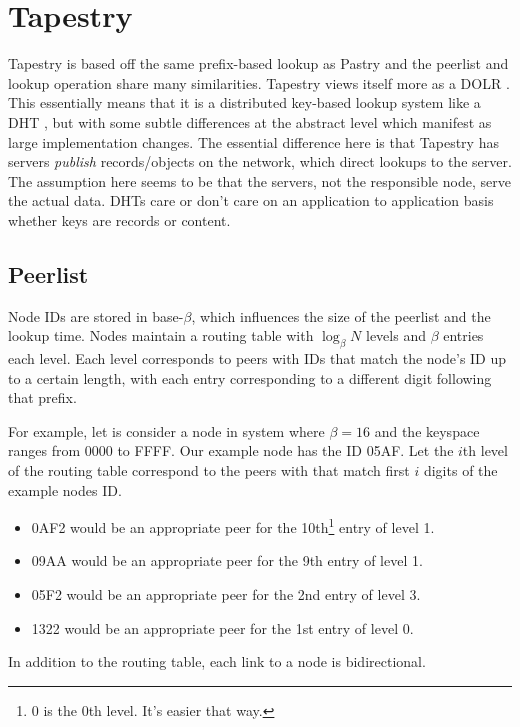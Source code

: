 \documentclass[10pt,letterpaper,twoside]{report}
\begin{document}
\section{Tapestry}
Tapestry \cite{tapestry} is based off the same prefix-based lookup \cite{prr} as Pastry \cite{pastry} and the peerlist and lookup operation share many similarities.
Tapestry views itself more as a DOLR \cite{dolr}.
This essentially means that it is a distributed key-based lookup system like a DHT \cite{hildrum2004distributed}, but with some subtle differences at the abstract level which manifest as large implementation changes.
The essential difference here is that Tapestry has servers \textit{publish} records/objects on the network, which direct lookups to the server.  
The assumption here seems to be that the servers, not the responsible node, serve the actual data.  
DHTs care or don't care on an application to application basis whether keys are records or content. 




\subsection*{Peerlist}
Node IDs are stored in base-$\beta$, which influences the size of the peerlist and the lookup time.
Nodes maintain a routing table with $\log_{\beta}N$ levels and $\beta$ entries each level.
Each level corresponds to peers with IDs that match the node's ID up to a certain length, with each entry corresponding to a different digit following that prefix.

For example, let is consider a node in system where $\beta = 16 $ and the keyspace ranges from $0000$ to FFFF.
Our example node has the ID 05AF.
Let the $i$th level of the routing table correspond to the peers with that match first $i$ digits of the example nodes ID.
\begin{itemize}
	\item 0AF2 would be an appropriate peer for the 10th\footnote{0 is the 0th level.  It's easier that way.} entry of level 1.
	\item 09AA would be an appropriate peer for the 9th entry of level 1.	
	\item 05F2 would be an appropriate peer for the 2nd entry of level 3.
	\item 1322 would be an appropriate peer for the 1st entry of level 0.
\end{itemize}

In addition to the routing table, each link to a node is bidirectional.
\end{document}
